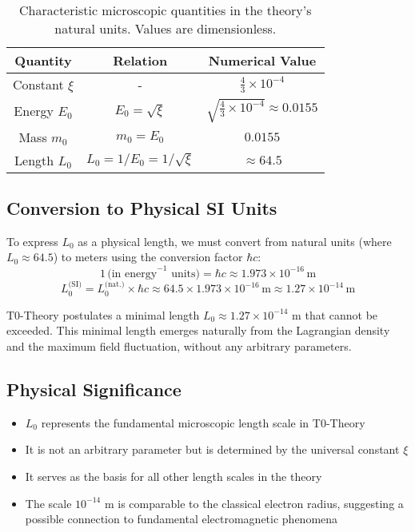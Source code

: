 \documentclass[12pt,a4paper]{article}
\numberwithin{equation}{section}
\begin{document}
	\begin{table}[h!]
		\centering
		\begin{tabular}{ccc}
			\toprule
			\textbf{Quantity} & \textbf{Relation} & \textbf{Numerical Value} \\
			\midrule
			Constant $\xi$ & - & $\frac{4}{3} \times 10^{-4}$ \\
			Energy $E_0$ & $E_0 = \sqrt{\xi}$ & $\sqrt{\frac{4}{3} \times 10^{-4}} \approx 0.0155$ \\
			Mass $m_0$ & $m_0 = E_0$ & $0.0155$ \\
			Length $L_0$ & $L_0 = 1/E_0 = 1/\sqrt{\xi}$ & $\approx 64.5$ \\
			\bottomrule
		\end{tabular}
		\caption{Characteristic microscopic quantities in the theory's natural units. Values are dimensionless.}
	\end{table}
	
	\subsection{Conversion to Physical SI Units}
	To express $L_0$ as a physical length, we must convert from natural units (where $L_0 \approx 64.5$) to meters using the conversion factor $\hbar c$:
	\[
	1 \, \text{(in energy}^{-1}\text{ units)} = \hbar c \approx 1.973 \times 10^{-16}\,\text{m}
	\]
	\[
	L_0^{\text{(SI)}} = L_0^{\text{(nat.)}} \times \hbar c \approx 64.5 \times 1.973 \times 10^{-16}\,\text{m} \approx 1.27 \times 10^{-14}\,\text{m}
	\]
	
	\begin{important}[]
		T0-Theory postulates a minimal length $L_0 \approx 1.27 \times 10^{-14}$ m that cannot be exceeded. This minimal length emerges naturally from the Lagrangian density and the maximum field fluctuation, without any arbitrary parameters.
	\end{important}
	
	\subsection{Physical Significance}
	
	\begin{itemize}
		\item $L_0$ represents the fundamental microscopic length scale in T0-Theory
		\item It is not an arbitrary parameter but is determined by the universal constant $\xi$
		\item It serves as the basis for all other length scales in the theory
		\item The scale $10^{-14}$ m is comparable to the classical electron radius, suggesting a possible connection to fundamental electromagnetic phenomena
	\end{itemize}
	
\end{document}

